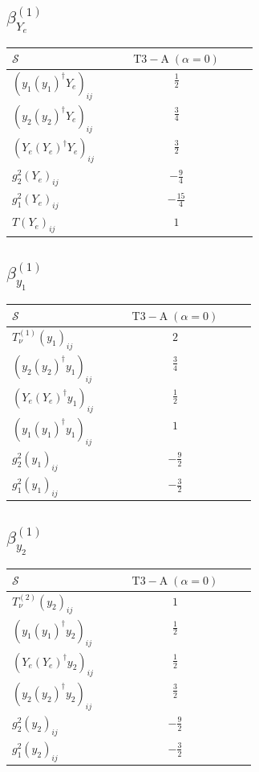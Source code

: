 \documentclass[9pt]{article}
\begin{document}
\subsection*{$ \beta_{Y_e}^{(1)} $}
\begin{longtable}{@{}p{0.38\linewidth}c@{}}
\toprule
$\mathcal{S}$ & $ \mathrm{T3-A}\;(\alpha=0) $ \\
\midrule
$ (y_1 (y_1)^{\dagger} Y_e)_{ij} $ & $ \frac{1}{2} $ \\
$ (y_2 (y_2)^{\dagger} Y_e)_{ij} $ & $ \frac{3}{4} $ \\
$ (Y_e (Y_e)^{\dagger} Y_e)_{ij} $ & $ \frac{3}{2} $ \\
$ g_2^2 (Y_e)_{ij} $ & $ - \frac{9}{4} $ \\
$ g_1^2 (Y_e)_{ij} $ & $ - \frac{15}{4} $ \\
$ T (Y_e)_{ij} $ & $ 1 $ \\
\bottomrule
\end{longtable}
\subsection*{$ \beta_{y_1}^{(1)} $}
\begin{longtable}{@{}p{0.38\linewidth}c@{}}
\toprule
$\mathcal{S}$ & $ \mathrm{T3-A}\;(\alpha=0) $ \\
\midrule
$ T_{\nu}^{(1)} (y_1)_{ij} $ & $ 2 $ \\
$ (y_2 (y_2)^{\dagger} y_1)_{ij} $ & $ \frac{3}{4} $ \\
$ (Y_e (Y_e)^{\dagger} y_1)_{ij} $ & $ \frac{1}{2} $ \\
$ (y_1 (y_1)^{\dagger} y_1)_{ij} $ & $ 1 $ \\
$ g_2^2 (y_1)_{ij} $ & $ - \frac{9}{2} $ \\
$ g_1^2 (y_1)_{ij} $ & $ - \frac{3}{2} $ \\
\bottomrule
\end{longtable}
\subsection*{$ \beta_{y_2}^{(1)} $}
\begin{longtable}{@{}p{0.38\linewidth}c@{}}
\toprule
$\mathcal{S}$ & $ \mathrm{T3-A}\;(\alpha=0) $ \\
\midrule
$ T_{\nu}^{(2)} (y_2)_{ij} $ & $ 1 $ \\
$ (y_1 (y_1)^{\dagger} y_2)_{ij} $ & $ \frac{1}{2} $ \\
$ (Y_e (Y_e)^{\dagger} y_2)_{ij} $ & $ \frac{1}{2} $ \\
$ (y_2 (y_2)^{\dagger} y_2)_{ij} $ & $ \frac{3}{2} $ \\
$ g_2^2 (y_2)_{ij} $ & $ - \frac{9}{2} $ \\
$ g_1^2 (y_2)_{ij} $ & $ - \frac{3}{2} $ \\
\bottomrule
\end{longtable}
\end{document}
